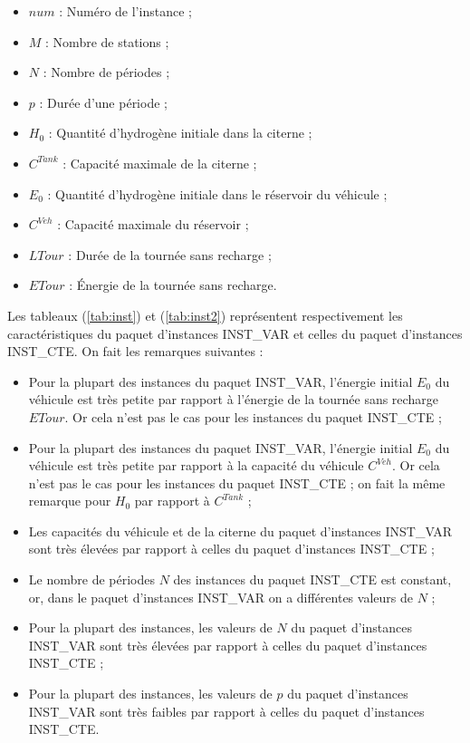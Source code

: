 {\begin{itemize}[label=$\square$]
	\item $num$ : Numéro de l'instance ;
	\item $M$ : Nombre de stations ;
	\item $N$ : Nombre de périodes ;
	\item $p$ : Durée d'une période ;
	\item $H_0$ : Quantité d'hydrogène initiale dans la citerne ;
	\item $C^{Tank}$ : Capacité maximale de la citerne ;
	\item $E_0$ : Quantité d'hydrogène initiale dans le réservoir du véhicule ;
	\item $C^{Veh}$ : Capacité maximale du réservoir ;
	\item $LTour$ : Durée de la tournée sans recharge ;
	\item $ETour$ : Énergie de la tournée sans recharge.
\end{itemize}
Les tableaux (\ref{tab:inst}) et (\ref{tab:inst2}) représentent respectivement les caractéristiques du paquet d'instances INST\_VAR et celles du paquet d'instances INST\_CTE.
On fait les remarques suivantes :
\begin{itemize}[label=$\square$]
	\item  Pour la plupart des instances du paquet INST\_VAR, l'énergie initial $E_0$ du véhicule est très petite par rapport à l'énergie de la tournée sans recharge $ETour$. Or cela n'est pas le cas pour les instances du paquet INST\_CTE ;
	\item Pour la plupart des instances du paquet INST\_VAR, l'énergie initial $E_0$ du véhicule est très petite par rapport à la capacité du véhicule $C^{Veh}$. Or cela n'est pas le cas pour les instances du paquet INST\_CTE ; on fait la même remarque pour $H_0$ par rapport à $C^{Tank}$ ;
	\item Les capacités du véhicule et de la citerne du paquet d'instances INST\_VAR sont très élevées par rapport à celles du paquet d'instances INST\_CTE ;
	\item Le nombre de périodes $N$ des instances du paquet INST\_CTE est constant, or, dans le paquet d'instances INST\_VAR on a différentes valeurs de $N$ ;
	\item Pour la plupart des instances, les valeurs de $N$ du paquet d'instances INST\_VAR sont très élevées par rapport à celles du paquet d'instances INST\_CTE ;
	\item Pour la plupart des instances, les valeurs de $p$ du paquet d'instances INST\_VAR sont très faibles par rapport à celles du paquet d'instances INST\_CTE.
\end{itemize}

}
